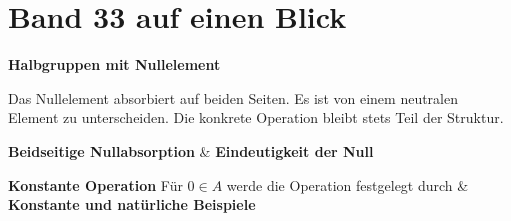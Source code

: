 \chapter[Band 33: Halbgruppen mit Nullelement]{Band 33 auf einen Blick}
\noindent\textbf{Halbgruppen mit Nullelement}\par\medskip
Das Nullelement absorbiert auf beiden Seiten. Es ist von einem
neutralen Element zu unterscheiden. Die konkrete Operation bleibt stets Teil
der Struktur.

\begin{BandUebersicht}
\textbf{Beidseitige Nullabsorption}
&
\textbf{Eindeutigkeit der Null}
 \\
\addlinespace[.8ex]

\textbf{Konstante Operation}
Für \(0\in A\) werde die Operation festgelegt durch\UebFormel{\begin{aligned}
&a,b\in A\ \vdash\ a\star b=0.
\end{aligned}}
&
\textbf{Konstante und natürliche Beispiele}
 \\
\addlinespace[.8ex]


\end{BandUebersicht}
